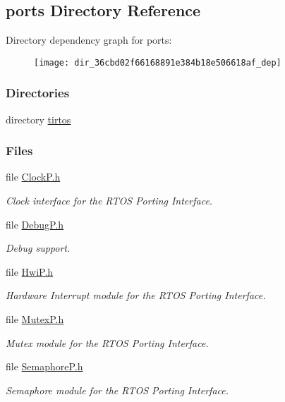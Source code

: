 \subsection{ports Directory Reference}
\label{dir_36cbd02f66168891e384b18e506618af}
Directory dependency graph for ports\+:
\nopagebreak
\begin{figure}[H]
\begin{center}
\leavevmode
\texttt{[image: dir\_36cbd02f66168891e384b18e506618af\_dep]}
\end{center}
\end{figure}
\subsubsection*{Directories}
\begin{DoxyCompactItemize}
\item 
directory \hyperlink{dir_e37980c85898e23beb9e8f64f948b033}{tirtos}
\end{DoxyCompactItemize}
\subsubsection*{Files}
\begin{DoxyCompactItemize}
\item 
file \hyperlink{_clock_p_8h}{Clock\+P.\+h}
\begin{DoxyCompactList}\small\item\em Clock interface for the R\+T\+O\+S Porting Interface. \end{DoxyCompactList}\item 
file \hyperlink{_debug_p_8h}{Debug\+P.\+h}
\begin{DoxyCompactList}\small\item\em Debug support. \end{DoxyCompactList}\item 
file \hyperlink{_hwi_p_8h}{Hwi\+P.\+h}
\begin{DoxyCompactList}\small\item\em Hardware Interrupt module for the R\+T\+O\+S Porting Interface. \end{DoxyCompactList}\item 
file \hyperlink{_mutex_p_8h}{Mutex\+P.\+h}
\begin{DoxyCompactList}\small\item\em Mutex module for the R\+T\+O\+S Porting Interface. \end{DoxyCompactList}\item 
file \hyperlink{_semaphore_p_8h}{Semaphore\+P.\+h}
\begin{DoxyCompactList}\small\item\em Semaphore module for the R\+T\+O\+S Porting Interface. \end{DoxyCompactList}\end{DoxyCompactItemize}
